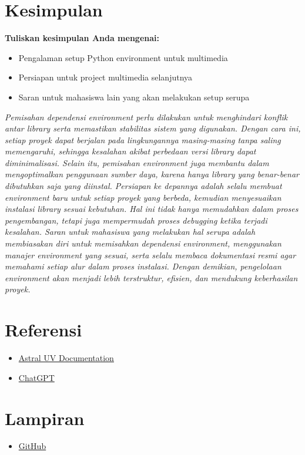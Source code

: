\documentclass[11pt,a4paper]{article}
\begin{document}
\section{Kesimpulan}
\textbf{Tuliskan kesimpulan Anda mengenai:}
\begin{itemize}
    \item Pengalaman setup Python environment untuk multimedia
    \item Persiapan untuk project multimedia selanjutnya
    \item Saran untuk mahasiswa lain yang akan melakukan setup serupa
\end{itemize}

\textit{
Pemisahan dependensi environment perlu dilakukan untuk menghindari konflik antar library serta memastikan stabilitas sistem yang digunakan. Dengan cara ini, setiap proyek dapat berjalan pada lingkungannya masing-masing tanpa saling memengaruhi, sehingga kesalahan akibat perbedaan versi library dapat diminimalisasi. Selain itu, pemisahan environment juga membantu dalam mengoptimalkan penggunaan sumber daya, karena hanya library yang benar-benar dibutuhkan saja yang diinstal. Persiapan ke depannya adalah selalu membuat environment baru untuk setiap proyek yang berbeda, kemudian menyesuaikan instalasi library sesuai kebutuhan. Hal ini tidak hanya memudahkan dalam proses pengembangan, tetapi juga mempermudah proses debugging ketika terjadi kesalahan. Saran untuk mahasiswa yang melakukan hal serupa adalah membiasakan diri untuk memisahkan dependensi environment, menggunakan manajer environment yang sesuai, serta selalu membaca dokumentasi resmi agar memahami setiap alur dalam proses instalasi. Dengan demikian, pengelolaan environment akan menjadi lebih terstruktur, efisien, dan mendukung keberhasilan proyek.}


\section{Referensi}
\begin{itemize}
    \item \href{https://docs.astral.sh/uv/}{Astral UV Documentation}
    \item \href{https://chatgpt.com/share/68b08d34-bc40-8000-97fd-3ddee3ee6b4c}{ChatGPT}
\end{itemize}

\section{Lampiran}
\begin{itemize}
    \item \href{https://github.com/Alfariz11/Sistem-Teknologi-Multimedia}{GitHub}
\end{itemize}
\end{document}
